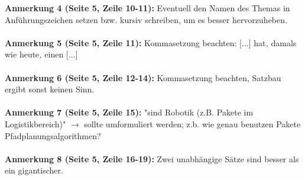 \documentclass[a4paper,12pt]{book}
\begin{document}
\noindent
\textbf{Anmerkung 4 (Seite 5, Zeile 10-11):}
Eventuell den Namen des Themas in Anführungszeichen setzen bzw. kursiv schreiben, um es besser hervorzuheben.\\
\\

\noindent
\textbf{Anmerkung 5 (Seite 5, Zeile 11):}
Kommasetzung beachten: [...] hat\emph{,} damals wie heute\emph{,} einen [...] \\
\\

\noindent
\textbf{Anmerkung 6 (Seite 5, Zeile 12-14):}
Kommasetzung beachten, Satzbau ergibt sonst keinen Sinn. \\
\\

\noindent
\textbf{Anmerkung 7 (Seite 5, Zeile 15):}
"sind Robotik (z.B. Pakete im Logistikbereich)" $\rightarrow$ sollte umformuliert werden; z.b. wie genau benutzen Pakete Pfadplanungsalgorithmen? \\
\\

\noindent
\textbf{Anmerkung 8 (Seite 5, Zeile 16-19):}
Zwei unabhängige Sätze sind besser als ein gigantischer. \\
\\
\end{document}
